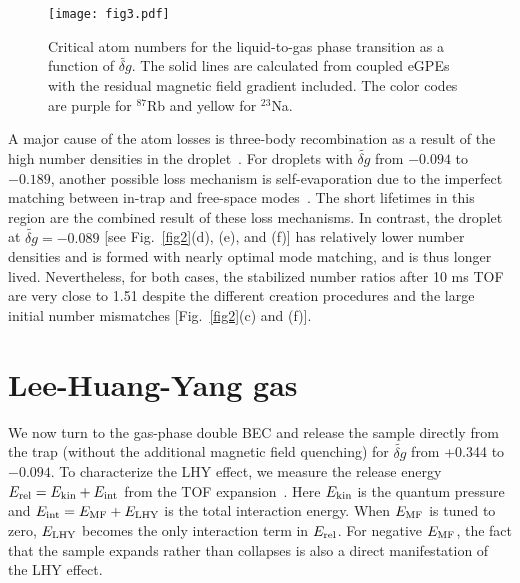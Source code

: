 \begin{figure}[htb]
\begin{center}
\texttt{[image: fig3.pdf]}
\end{center}
\caption{Critical atom numbers for the liquid-to-gas phase transition as a function of $\widetilde{\delta g}$. The solid lines
are calculated from coupled eGPEs with the residual magnetic field gradient included.  The color codes are purple for $^{87}$Rb and yellow for $^{23}$Na. }
\label{fig3}
\end{figure}

A major cause of the atom losses is three-body recombination as a result of the high number densities in the droplet~\cite{cabrera2018quantum,semeghini2018self,DErrico2019,SM}. For droplets with $\widetilde{\delta g}$ from $-0.094$ to $-0.189$, another possible loss mechanism is self-evaporation due to the imperfect matching between in-trap and free-space modes~\cite{Ferioli2020}. The short lifetimes in this region are the combined result of these loss mechanisms. In contrast, the droplet at $\widetilde{\delta g} = -0.089$ [see Fig.~\ref{fig2}(d), (e), and (f)] has relatively lower number densities and is formed with nearly optimal mode matching, and is thus longer lived. Nevertheless, for both cases, the stabilized number ratios after 10 ms TOF are very close to 1.51 despite the different creation procedures and the large initial number mismatches [Fig.~\ref{fig2}(c) and (f)].

\section{Lee-Huang-Yang gas}
\label{sec:LHY_gas}

We now turn to the gas-phase double BEC and release the sample directly from the trap (without the additional magnetic field quenching) for $\widetilde{\delta g}$ from +0.344 to $-0.094$. To characterize the LHY effect, we measure the release energy $E_{\rm rel}=E_{\rm kin}+E_{\rm int}$ from the TOF expansion~\cite{Holland1997,Mewes1996,SM}. Here $E_\text{\rm kin}$ is the quantum pressure and $E_{\rm int}=E_{\rm MF}+E_{\rm LHY}$ is the total interaction energy. When $E_{\rm MF}$ is tuned to zero, $E_{\rm LHY}$ becomes the only interaction term in $E_{\rm rel}$. For negative $E_{\rm MF}$, the fact that the sample expands rather than collapses is also a direct manifestation of the LHY effect.

